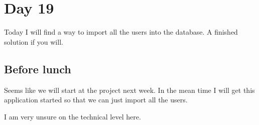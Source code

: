 \section{Day 19}
Today I will find a way to import all the users into the database. 
A finished solution if you will.

\subsection{Before lunch}
Seems like we will start at the project next week.
In the mean time I will get this application started so that we can just import all the users.

I am very unsure on the technical level here.
